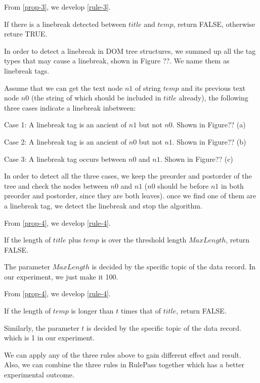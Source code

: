 From \ref{prop-3}, we develop \ref{rule-3}.

\begin{newrule}\label{rule-3}
If there is a linebreak detected between $title$ and $temp$, return FALSE, otherwise reture TRUE.
\end{newrule}

In order to detect a linebreak in DOM tree structures, 
we summed up all the tag types that may cause a linebreak,
shown in Figure ??.
We name them as linebreak tags.

Assume that we can get the text node $n1$ of string $temp$
and its previous text node $n0$
(the string of which should be included in $title$ already),
the following three cases indicate a linebreak inbetween:

Case 1:
A linebreak tag is an ancient of $n1$ but not $n0$.
Shown in Figure?? (a)

Case 2:
A linebreak tag is an ancient of $n0$ but not $n1$.
Shown in Figure?? (b)

Case 3:
A linebreak tag occurs between $n0$ and $n1$.
Shown in Figure?? (c)

In order to detect all the three cases,
we keep the preorder and postorder of the tree 
and check the nodes between $n0$ and $n1$ 
($n0$ should be before $n1$ in both preorder and postorder,
since they are both leaves).
once we find one of them are a linebreak tag, 
we detect the linebreak and stop the algorithm.

From \ref{prop-4}, we develop \ref{rule-4}.

\begin{newrule}\label{rule-4}
If the length of $title$ plus $temp$ is over the threshold length $MaxLength$, return FALSE.
\end{newrule}

The parameter $MaxLength$ is decided by the specific topic of the data record.
In our experiment, we just make it 100.

From \ref{prop-4}, we develop \ref{rule-4}.

\begin{newrule}\label{rule-4}
If the length of $temp$ is  longer than $t$ times that of $title$, return FALSE.
\end{newrule}

Similarly, the parameter $t$ is decided by the specific topic of the data record.
which is 1 in our experiment.

We can apply any of the three rules above to gain different effect and result.
Also, we can combine the three rules in RulePass together 
which has a better experimental outcome.


